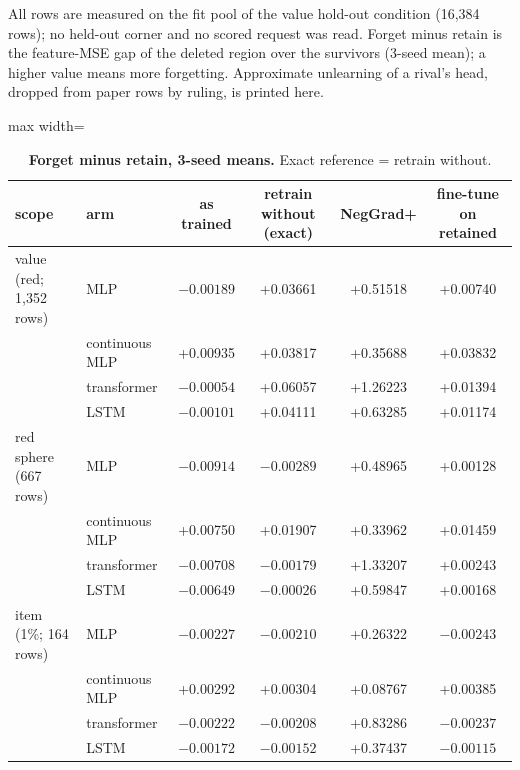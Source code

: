 \documentclass{article} %
\begin{document}
All rows are measured on the fit pool of the value hold-out condition (16,384 rows); no held-out corner %
and no scored request was read. Forget minus retain is the feature-MSE gap of the deleted region
over the survivors (3-seed mean); a higher value means more forgetting. Approximate unlearning of a
rival's head, dropped from paper rows by ruling, is printed here.

\begin{table}[h]
\centering\small
\caption{\textbf{Forget minus retain, 3-seed means.} Exact reference = retrain without.}
\label{tab:unlearn}
\setlength{\tabcolsep}{3pt}
\begin{adjustbox}{max width=\linewidth}\begin{tabular}{llcccc}
\toprule
scope & arm & as trained & retrain without (exact) & NegGrad+ & fine-tune on retained \\
\midrule
value (red; 1,352 rows) & MLP & $-0.00189$ & +0.03661 & +0.51518 & +0.00740 \\
 & continuous MLP & +0.00935 & +0.03817 & +0.35688 & +0.03832 \\
 & transformer & $-0.00054$ & +0.06057 & +1.26223 & +0.01394 \\
 & LSTM & $-0.00101$ & +0.04111 & +0.63285 & +0.01174 \\
red sphere (667 rows) & MLP & $-0.00914$ & $-0.00289$ & +0.48965 & +0.00128 \\
 & continuous MLP & +0.00750 & +0.01907 & +0.33962 & +0.01459 \\
 & transformer & $-0.00708$ & $-0.00179$ & +1.33207 & +0.00243 \\
 & LSTM & $-0.00649$ & $-0.00026$ & +0.59847 & +0.00168 \\
item (1\%; 164 rows) & MLP & $-0.00227$ & $-0.00210$ & +0.26322 & $-0.00243$ \\
 & continuous MLP & +0.00292 & +0.00304 & +0.08767 & +0.00385 \\
 & transformer & $-0.00222$ & $-0.00208$ & +0.83286 & $-0.00237$ \\
 & LSTM & $-0.00172$ & $-0.00152$ & +0.37437 & $-0.00115$ \\
\bottomrule
\end{tabular}\end{adjustbox}
\end{table}
\end{document}

